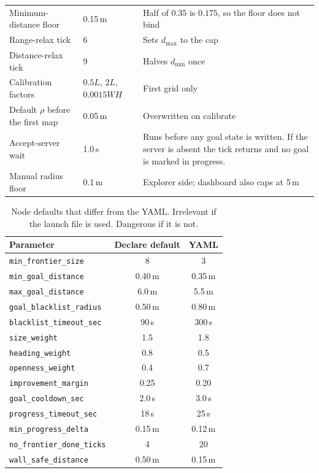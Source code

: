 \documentclass[11pt]{article}
\begin{document}
\begin{longtable}{@{}p{4.6cm}p{2.0cm}p{7.4cm}@{}}
Minimum-distance floor & 0.15\,m & Half of $0.35$ is $0.175$, so the floor does not bind \\
Range-relax tick & 6 & Sets $d_{\max}$ to the cap \\
Distance-relax tick & 9 & Halves $d_{\min}$ once \\
Calibration factors & $0.5 L$, $2 L$, $0.0015 WH$ & First grid only \\
Default $\rho$ before the first map & 0.05\,m & Overwritten on calibrate \\
Accept-server wait & 1.0\,s & Runs before any goal state is written. If the server is absent the tick returns and no goal is marked in progress. \\
Manual radius floor & 0.1\,m & Explorer side; dashboard also caps at 5\,m \\
\bottomrule
\end{longtable}

\begin{table}[ht]
\centering
\caption{Node defaults that differ from the YAML. Irrelevant if the launch file is used. Dangerous if it is not.}
\label{tab:defaults}
\small
\begin{tabular}{@{}lcc@{}}
\toprule
Parameter & Declare default & YAML \\
\midrule
\texttt{min\_frontier\_size} & 8 & 3 \\
\texttt{min\_goal\_distance} & 0.40\,m & 0.35\,m \\
\texttt{max\_goal\_distance} & 6.0\,m & 5.5\,m \\
\texttt{goal\_blacklist\_radius} & 0.50\,m & 0.80\,m \\
\texttt{blacklist\_timeout\_sec} & 90\,s & 300\,s \\
\texttt{size\_weight} & 1.5 & 1.8 \\
\texttt{heading\_weight} & 0.8 & 0.5 \\
\texttt{openness\_weight} & 0.4 & 0.7 \\
\texttt{improvement\_margin} & 0.25 & 0.20 \\
\texttt{goal\_cooldown\_sec} & 2.0\,s & 3.0\,s \\
\texttt{progress\_timeout\_sec} & 18\,s & 25\,s \\
\texttt{min\_progress\_delta} & 0.15\,m & 0.12\,m \\
\texttt{no\_frontier\_done\_ticks} & 4 & 20 \\
\texttt{wall\_safe\_distance} & 0.50\,m & 0.15\,m \\
\bottomrule
\end{tabular}
\end{table}
\end{document}
